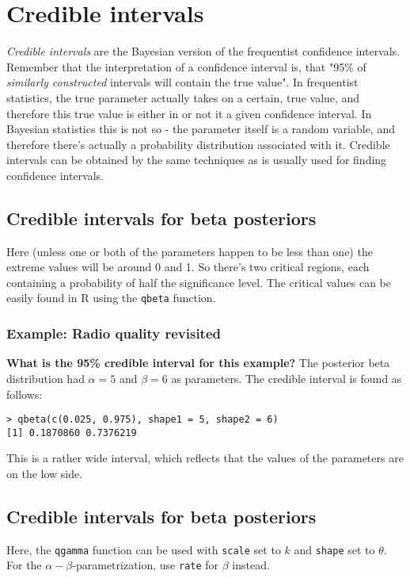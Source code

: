 \documentclass[12pt, a4paper]{article}
\begin{document}
\section{Credible intervals}
\textit{Credible intervals} are the Bayesian version of the frequentist confidence intervals. Remember that the interpretation of a confidence interval is, that "95\% of \textit{similarly constructed} intervals will contain the true value". In frequentist statistics, the true parameter actually takes on a certain, true value, and therefore this true value is either in or not it a given confidence interval. In Bayesian statistics this is not so - the parameter itself is a random variable, and therefore there's actually a probability distribution associated with it. Credible intervals can be obtained by the same techniques as is usually used for finding confidence intervals.

\subsection{Credible intervals for beta posteriors}
Here (unless one or both of the parameters happen to be less than one) the extreme values will be around 0 and 1. So there's two critical regions, each containing a probability of half the significance level. The critical values can be easily found in R using the \verb|qbeta| function.

\subsubsection{Example: Radio quality revisited}
\textbf{What is the 95\% credible interval for this example?} The posterior beta distribution had $\alpha=5$ and $\beta=6$ as parameters. The credible interval is found as follows:
\begin{verbatim}
> qbeta(c(0.025, 0.975), shape1 = 5, shape2 = 6)
[1] 0.1870860 0.7376219
\end{verbatim}
This is a rather wide interval, which reflects that the values of the parameters are on the low side.

\subsection{Credible intervals for beta posteriors}
Here, the \verb|qgamma| function can be used with \verb|scale| set to $k$ and \verb|shape| set to $\theta$. For the $\alpha-\beta$-parametrization, use \verb|rate| for $\beta$ instead.
\end{document}
